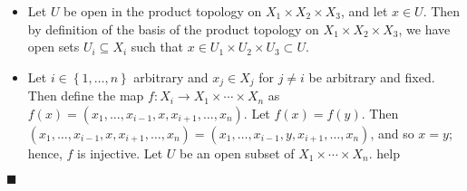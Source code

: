 \documentclass[12pt]{article}
\renewcommand{\qed}{\hfill$\blacksquare$}
\renewenvironment{proof}{\begin{addmargin}[1em]{0em}\begin{newproof}}{\end{newproof}\end{addmargin}\qed}
\begin{document}
\begin{proof}
\begin{itemize}
	\item Let $U$ be open in the product topology on $X_1 \times X_2 \times X_3$, and let $x\in U$. Then by definition of the basis of the product topology on $X_1 \times X_2 \times X_3$, we have open sets $U_i \subseteq X_i$ such that $x \in U_1 \times  U_2 \times  U_3 \subset U$.

	\item Let $i \in \left\{1,\ldots,n\right\}$ arbitrary and $x_j \in X_j$ for $j \neq i$ be arbitrary and fixed. Then define the map $f:X_i \rightarrow X_1 \times \cdots \times X_n$ as $f\left(x\right) = \left(x_1,\ldots,x_{i-1},x,x_{i+1},\ldots,x_n\right)$. Let $f\left(x\right) = f\left(y\right)$. Then $\left(x_1,\ldots,x_{i-1},x,x_{i+1},\ldots,x_n\right)=\left(x_1,\ldots,x_{i-1},y,x_{i+1},\ldots,x_n\right)$, and so $x=y$; hence, $f$ is injective. Let $U$ be an open subset of $X_1 \times \cdots \times X_n$. {\color{red} help}
	

\end{itemize}
\end{proof}
\end{document}
